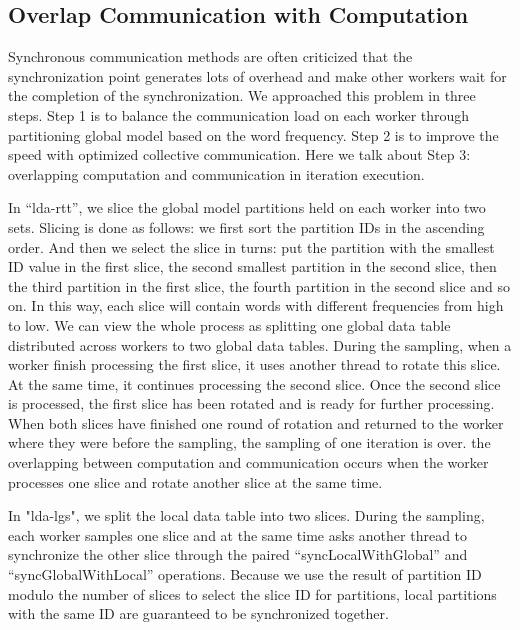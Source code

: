 \documentclass[conference]{IEEEtran}
\begin{document}
\subsection{Overlap Communication with Computation}
Synchronous communication methods are often criticized that
the synchronization point generates lots of overhead 
and make other workers wait for the completion of the synchronization. 
We approached this problem in three steps.
Step 1 is to balance the communication load on each worker
through partitioning global model based on the word frequency.
Step 2 is to improve the speed with optimized collective communication.
Here we talk about Step 3: overlapping computation and communication 
in iteration execution.

In ``lda-rtt'',
we slice the global model partitions held on each worker into two sets. 
Slicing is done as follows:
we first sort the partition IDs in the ascending order.
And then we select the slice in turns: put the partition with the smallest ID value 
in the first slice, the second smallest partition in the second slice, 
then the third partition in the first slice, 
the fourth partition in the second slice and so on.
In this way, each slice will contain words with different frequencies 
from high to low.
We can view the whole process
as splitting one global data table distributed across workers
to two global data tables. 
During the sampling, 
when a worker finish processing the first slice, 
it uses another thread to rotate this slice.
At the same time, it continues processing the second slice.
Once the second slice is processed,
the first slice has been rotated and is ready for further processing.
When both slices have finished one round of rotation
and returned to the worker where they were before the sampling,
the sampling of one iteration is over.
the overlapping between computation and communication occurs 
when the worker processes one slice and rotate another slice at the same time.

In "lda-lgs",
we split the local data table into two slices.
During the sampling, 
each worker samples one slice 
and at the same time asks another thread to synchronize the other slice
through the paired ``syncLocalWithGlobal'' and ``syncGlobalWithLocal'' operations.
Because we use the result of partition ID modulo the number of slices
to select the slice ID for partitions,
local partitions with the same ID are guaranteed to be synchronized together.
%
\end{document}

